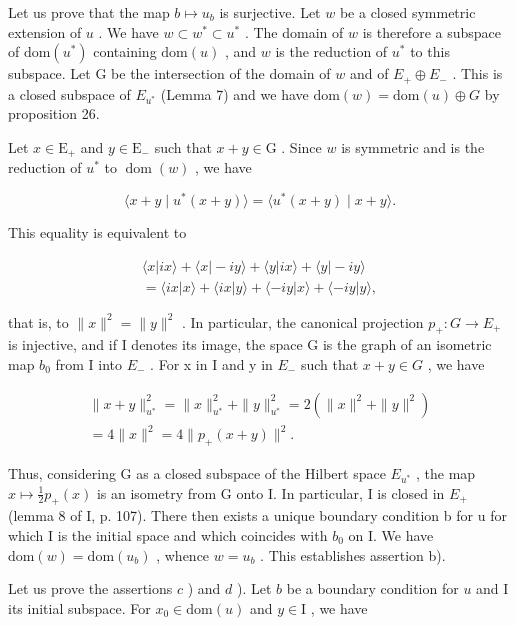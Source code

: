 Let us prove that the map \(b \mapsto u_b\) is surjective. Let \(w\) be a closed symmetric extension of \(u\) . We have \(w \subset w^* \subset u^*\) . The domain of \(w\) is therefore a subspace of \(\text{dom}(u^*)\) containing \(\text{dom}(u)\) , and \(w\) is the reduction of \(u^*\) to this subspace. Let G be the intersection of the domain of \(w\) and of \(E_+ \oplus E_-\) . This is a closed subspace of \(E_{u^*}\) (Lemma 7) and we have \(\text{dom}(w) = \text{dom}(u) \oplus G\) by proposition 26.

Let \(x \in \mathrm{E}_{+}\) and \(y \in \mathrm{E}_{-}\) such that \(x + y \in \mathrm{G}\) . Since \(w\) is symmetric and is the reduction of \(u^{*}\) to \(\operatorname{dom}(w)\) , we have

\[
\langle x + y \mid u ^ {*} (x + y) \rangle = \langle u ^ {*} (x + y) \mid x + y \rangle .
\]

This equality is equivalent to

\[
\begin{array}{c} \langle x | i x \rangle + \langle x | - i y \rangle + \langle y | i x \rangle + \langle y | - i y \rangle \\ = \langle i x | x \rangle + \langle i x | y \rangle + \langle - i y | x \rangle + \langle - i y | y \rangle , \end{array}
\]

that is, to \(\|x\|^{2} = \|y\|^{2}\) . In particular, the canonical projection \(p_{+}: G \to E_{+}\) is injective, and if I denotes its image, the space G is the graph of an isometric map \(b_{0}\) from I into \(E_{-}\) . For x in I and y in \(E_{-}\) such that \(x + y \in G\) , we have

\[
\begin{array}{r} \| x + y \| _ {u ^ {*}} ^ {2} = \| x \| _ {u ^ {*}} ^ {2} + \| y \| _ {u ^ {*}} ^ {2} = 2 (\| x \| ^ {2} + \| y \| ^ {2}) \\ = 4 \| x \| ^ {2} = 4 \| p _ {+} (x + y) \| ^ {2}. \end{array}
\]

Thus, considering G as a closed subspace of the Hilbert space \(E_{u^{*}}\) , the map \(x \mapsto \frac{1}{2}p_{+}(x)\) is an isometry from G onto I. In particular, I is closed in \(E_{+}\) (lemma 8 of I, p. 107). There then exists a unique boundary condition b for u for which I is the initial space and which coincides with \(b_{0}\) on I. We have \(\text{dom}(w) = \text{dom}(u_{b})\) , whence \(w = u_{b}\) . This establishes assertion b).

Let us prove the assertions \(c\) ) and \(d\) ). Let \(b\) be a boundary condition for \(u\) and I its initial subspace. For \(x_0 \in \mathrm{dom}(u)\) and \(y \in \mathrm{I}\) , we have

